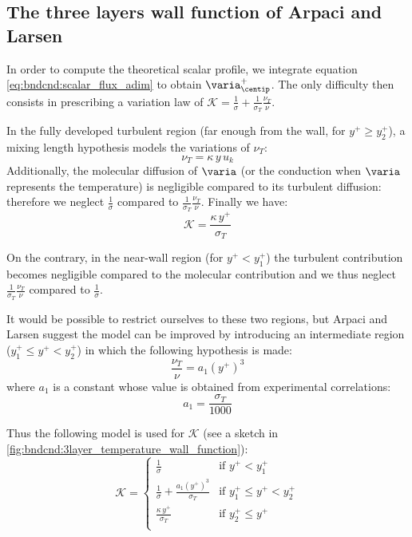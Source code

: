 \subsection{The three layers wall function of Arpaci and Larsen}

In order to compute the theoretical scalar profile, we integrate 
equation \eqref{eq:bndcnd:scalar_flux_adim} to obtain 
$\varia^+_{\centip}$. 
The only difficulty then consists in prescribing a variation law of
$\mathcal{K}=\displaystyle\frac{1}{\sigma}+ \displaystyle\frac{1}{\sigma_T}\frac{\nu_T}{\nu}$.

In the fully developed turbulent region 
(far enough from the wall, for $y^+\geqslant y^+_2$),
a mixing length hypothesis models the variations of 
$\nu_T$:
\begin{equation}
\nu_T = \kappa \,y\,u_k
\end{equation}
Additionally, the molecular diffusion of $\varia$
(or the conduction when $\varia$ represents the temperature)
is negligible compared to its turbulent diffusion: therefore 
we neglect 
$\displaystyle\frac{1}{\sigma}$ compared to  
$\displaystyle\frac{1}{\sigma_T}\frac{\nu_T}{\nu}$. 
Finally we have:
\begin{equation}
\mathcal{K}= \displaystyle\frac{\kappa \,y^+}{\sigma_T}
\end{equation}

On the contrary, in the near-wall region (for $y^+ < y^+_1$)
the turbulent contribution becomes negligible 
compared to the molecular contribution and we thus neglect 
$\displaystyle\frac{1}{\sigma_T}\frac{\nu_T}{\nu}$ compared to  
$\displaystyle\frac{1}{\sigma}$.

It would be possible to restrict ourselves to these 
two regions, but Arpaci and Larsen suggest the model 
can be improved by introducing an intermediate 
region ($y^+_1 \leqslant y^+ < y^+_2$) 
in which the following hypothesis is made:
\begin{equation}
\frac{\nu_T}{\nu} = a_1 \left( y^+ \right)^3
\end{equation}
where $a_1$ is a constant whose value is obtained from
experimental correlations:
\begin{equation}
a_1 =\displaystyle\frac{\sigma_T}{1000}
\end{equation}

Thus the following model is used for $\mathcal{K}$ 
(see a sketch
in \figurename~ \ref{fig:bndcnd:3layer_temperature_wall_function}):
\begin{equation}
\mathcal{K}=\left\{
\begin{array}{ll}
\displaystyle\frac{1}{\sigma}
             &\text{if } y^+ < y^+_1\\
\displaystyle\frac{1}{\sigma}
+\displaystyle\frac{a_1 (y^+)^3}{\sigma_T}
             &\text{if } y^+_1 \leqslant y^+ < y^+_2\\
\displaystyle\frac{\kappa \,y^+}{\sigma_T}
             &\text{if } y^+_2\leqslant y^+\\
\end{array}
\right.
\end{equation}

